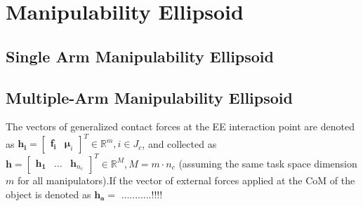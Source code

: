 \chapter{Manipulability Ellipsoid }
\label{ch:appendixB}

\section{Single Arm Manipulability Ellipsoid}
\label{sec:ArmManipulability}

\cite{ManipulabilityYoshikawa}
\cite{YoshikawaRedundancy}\cite{YoshikawaRoboticsBook}\cite{TRManipulability}

\cite{Siciliano}

\cite{TaskCompatibilityEllipsoid}\cite{TaskCompatibilityPosture}
\cite{EllipsoidTracking}

\cite{AsadaDynamicManipulability}

\cite{PolytopesManipulability}

\section{Multiple-Arm Manipulability Ellipsoid}
\label{sec:ArmManipulability}

\cite{CooperativeManipulators}
The vectors of generalized contact forces at the EE interaction point are denoted as $\mathbf{h_i} = \begin{bmatrix}
\mathbf{f_i} & \mathbf{\mu}_i \end{bmatrix}^T \in \mathbb{R}^m, i\in J_c  $, and collected as $\mathbf{h} = \begin{bmatrix}
\mathbf{h_1} & \dots & \mathbf{h}_{n_c} \end{bmatrix}^T \in \mathbb{R}^M, M = m\cdot n_c$ (assuming the same task space dimension $m$ for all manipulators).If the vector of external forces applied at the CoM of the object is denoted as $\mathbf{h_a} = $ ...........!!!!


\cite{DualArmManipulability}
\cite{MultiArmManipulability} 

\cite{DualArmSpaceManipulabilityMeasure}
\cite{DualArmSpaceManipulabilityEllipsoid}
